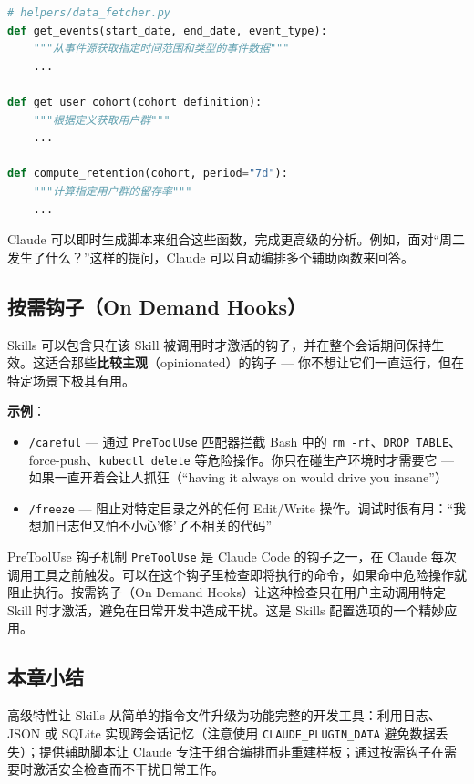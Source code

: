 \documentclass[a4paper]{article}
\begin{document}
\begin{lstlisting}[caption={Skill 中辅助函数库示例：数据获取与分析},language=Python]
# helpers/data_fetcher.py
def get_events(start_date, end_date, event_type):
    """从事件源获取指定时间范围和类型的事件数据"""
    ...

def get_user_cohort(cohort_definition):
    """根据定义获取用户群"""
    ...

def compute_retention(cohort, period="7d"):
    """计算指定用户群的留存率"""
    ...
\end{lstlisting}

Claude 可以即时生成脚本来组合这些函数，完成更高级的分析。例如，面对``周二发生了什么？''这样的提问，Claude 可以自动编排多个辅助函数来回答。

\subsection{按需钩子（On Demand Hooks）}

Skills 可以包含只在该 Skill 被调用时才激活的钩子，并在整个会话期间保持生效。这适合那些\textbf{比较主观}（opinionated）的钩子 --- 你不想让它们一直运行，但在特定场景下极其有用。

\textbf{示例}：
\begin{itemize}
    \item \texttt{/careful} --- 通过 \texttt{PreToolUse} 匹配器拦截 Bash 中的 \texttt{rm -rf}、\texttt{DROP TABLE}、force-push、\texttt{kubectl delete} 等危险操作。你只在碰生产环境时才需要它 --- 如果一直开着会让人抓狂（``having it always on would drive you insane''）
    \item \texttt{/freeze} --- 阻止对特定目录之外的任何 Edit/Write 操作。调试时很有用：``我想加日志但又怕不小心'修'了不相关的代码''
\end{itemize}

\begin{knowledgebox}{PreToolUse 钩子机制}
\texttt{PreToolUse} 是 Claude Code 的钩子之一，在 Claude 每次调用工具之前触发。可以在这个钩子里检查即将执行的命令，如果命中危险操作就阻止执行。按需钩子（On Demand Hooks）让这种检查只在用户主动调用特定 Skill 时才激活，避免在日常开发中造成干扰。这是 Skills 配置选项的一个精妙应用。
\end{knowledgebox}

\subsection{本章小结}

高级特性让 Skills 从简单的指令文件升级为功能完整的开发工具：利用日志、JSON 或 SQLite 实现跨会话记忆（注意使用 \texttt{CLAUDE\_PLUGIN\_DATA} 避免数据丢失）；提供辅助脚本让 Claude 专注于组合编排而非重建样板；通过按需钩子在需要时激活安全检查而不干扰日常工作。
\end{document}
